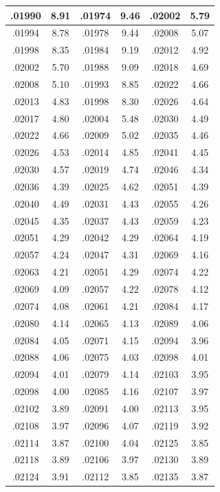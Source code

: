 \documentclass[11pt]{report}
\begin{document}
\begin{appendices}
\begin{longtable}{|c|c||c|c||c|c|}
.01990 & 8.91 & .01974 & 9.46 & .02002 & 5.79\\\hline
.01994 & 8.78 & .01978 & 9.44 & .02008 & 5.07\\\hline
.01998 & 8.35 & .01984 & 9.19 & .02012 & 4.92\\\hline
.02002 & 5.70 & .01988 & 9.09 & .02018 & 4.69\\\hline
.02008 & 5.10 & .01993 & 8.85 & .02022 & 4.66\\\hline
.02013 & 4.83 & .01998 & 8.30 & .02026 & 4.64\\\hline
.02017 & 4.80 & .02004 & 5.48 & .02030 & 4.49\\\hline
.02022 & 4.66 & .02009 & 5.02 & .02035 & 4.46\\\hline
.02026 & 4.53 & .02014 & 4.85 & .02041 & 4.45\\\hline
.02030 & 4.57 & .02019 & 4.74 & .02046 & 4.34\\\hline
.02036 & 4.39 & .02025 & 4.62 & .02051 & 4.39\\\hline
.02040 & 4.49 & .02031 & 4.43 & .02055 & 4.26\\\hline
.02045 & 4.35 & .02037 & 4.43 & .02059 & 4.23\\\hline
.02051 & 4.29 & .02042 & 4.29 & .02064 & 4.19\\\hline
.02057 & 4.24 & .02047 & 4.31 & .02069 & 4.16\\\hline
.02063 & 4.21 & .02051 & 4.29 & .02074 & 4.22\\\hline
.02069 & 4.09 & .02057 & 4.22 & .02078 & 4.12\\\hline
.02074 & 4.08 & .02061 & 4.21 & .02084 & 4.17\\\hline
.02080 & 4.14 & .02065 & 4.13 & .02089 & 4.06\\\hline
.02084 & 4.05 & .02071 & 4.15 & .02094 & 3.96\\\hline
.02088 & 4.06 & .02075 & 4.03 & .02098 & 4.01\\\hline
.02094 & 4.01 & .02079 & 4.14 & .02103 & 3.95\\\hline
.02098 & 4.00 & .02085 & 4.16 & .02107 & 3.97\\\hline
.02102 & 3.89 & .02091 & 4.00 & .02113 & 3.95\\\hline
.02108 & 3.97 & .02096 & 4.07 & .02119 & 3.92\\\hline
.02114 & 3.87 & .02100 & 4.04 & .02125 & 3.85\\\hline
.02118 & 3.89 & .02106 & 3.97 & .02130 & 3.89\\\hline
.02124 & 3.91 & .02112 & 3.85 & .02135 & 3.87\\\hline

\end{longtable}
\end{appendices}
\end{document}
